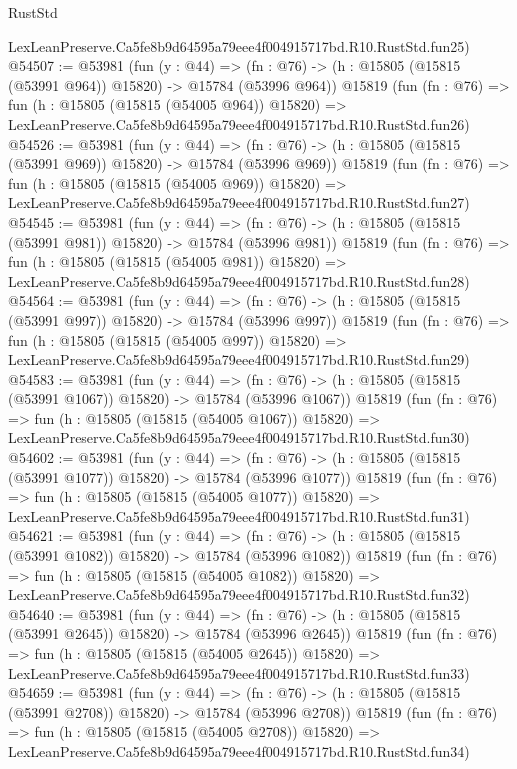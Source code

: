 \begin{lexlean}{RustStd}
\begin{coremodule}
    LexLeanPreserve.Ca5fe8b9d64595a79eee4f004915717bd.R10.RustStd.fun25)
@54507 := @53981
    (fun (y : @44) =>
    (fn : @76) -> (h : @15805 (@15815 (@53991 @964)) @15820) -> @15784 (@53996 @964))
    @15819
    (fun (fn : @76) =>
    fun (h : @15805 (@15815 (@54005 @964)) @15820) =>
    LexLeanPreserve.Ca5fe8b9d64595a79eee4f004915717bd.R10.RustStd.fun26)
@54526 := @53981
    (fun (y : @44) =>
    (fn : @76) -> (h : @15805 (@15815 (@53991 @969)) @15820) -> @15784 (@53996 @969))
    @15819
    (fun (fn : @76) =>
    fun (h : @15805 (@15815 (@54005 @969)) @15820) =>
    LexLeanPreserve.Ca5fe8b9d64595a79eee4f004915717bd.R10.RustStd.fun27)
@54545 := @53981
    (fun (y : @44) =>
    (fn : @76) -> (h : @15805 (@15815 (@53991 @981)) @15820) -> @15784 (@53996 @981))
    @15819
    (fun (fn : @76) =>
    fun (h : @15805 (@15815 (@54005 @981)) @15820) =>
    LexLeanPreserve.Ca5fe8b9d64595a79eee4f004915717bd.R10.RustStd.fun28)
@54564 := @53981
    (fun (y : @44) =>
    (fn : @76) -> (h : @15805 (@15815 (@53991 @997)) @15820) -> @15784 (@53996 @997))
    @15819
    (fun (fn : @76) =>
    fun (h : @15805 (@15815 (@54005 @997)) @15820) =>
    LexLeanPreserve.Ca5fe8b9d64595a79eee4f004915717bd.R10.RustStd.fun29)
@54583 := @53981
    (fun (y : @44) =>
    (fn : @76) -> (h : @15805 (@15815 (@53991 @1067)) @15820) -> @15784 (@53996 @1067))
    @15819
    (fun (fn : @76) =>
    fun (h : @15805 (@15815 (@54005 @1067)) @15820) =>
    LexLeanPreserve.Ca5fe8b9d64595a79eee4f004915717bd.R10.RustStd.fun30)
@54602 := @53981
    (fun (y : @44) =>
    (fn : @76) -> (h : @15805 (@15815 (@53991 @1077)) @15820) -> @15784 (@53996 @1077))
    @15819
    (fun (fn : @76) =>
    fun (h : @15805 (@15815 (@54005 @1077)) @15820) =>
    LexLeanPreserve.Ca5fe8b9d64595a79eee4f004915717bd.R10.RustStd.fun31)
@54621 := @53981
    (fun (y : @44) =>
    (fn : @76) -> (h : @15805 (@15815 (@53991 @1082)) @15820) -> @15784 (@53996 @1082))
    @15819
    (fun (fn : @76) =>
    fun (h : @15805 (@15815 (@54005 @1082)) @15820) =>
    LexLeanPreserve.Ca5fe8b9d64595a79eee4f004915717bd.R10.RustStd.fun32)
@54640 := @53981
    (fun (y : @44) =>
    (fn : @76) -> (h : @15805 (@15815 (@53991 @2645)) @15820) -> @15784 (@53996 @2645))
    @15819
    (fun (fn : @76) =>
    fun (h : @15805 (@15815 (@54005 @2645)) @15820) =>
    LexLeanPreserve.Ca5fe8b9d64595a79eee4f004915717bd.R10.RustStd.fun33)
@54659 := @53981
    (fun (y : @44) =>
    (fn : @76) -> (h : @15805 (@15815 (@53991 @2708)) @15820) -> @15784 (@53996 @2708))
    @15819
    (fun (fn : @76) =>
    fun (h : @15805 (@15815 (@54005 @2708)) @15820) =>
    LexLeanPreserve.Ca5fe8b9d64595a79eee4f004915717bd.R10.RustStd.fun34)

\end{coremodule}
\end{lexlean}
